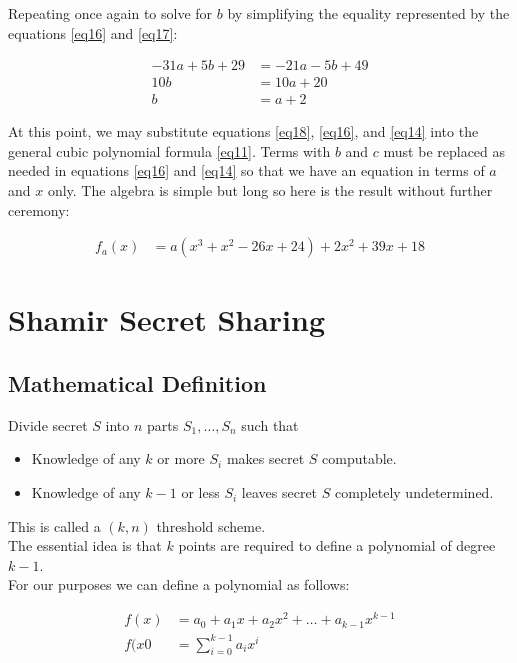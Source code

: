 \documentclass[preview,border=3mm]{article}
\begin{document}
\noindent
Repeating once again to solve for $b$ by simplifying the equality represented
by the equations \ref{eq16} and \ref{eq17}:

\begin{align}
    -31a + 5b + 29 &= -21a - 5b + 49 \nonumber \\
    10b &= 10a + 20 \nonumber \\
    b &= a + 2 \label{eq18}
\end{align}

\noindent
At this point, we may substitute equations \ref{eq18}, \ref{eq16}, and \ref{eq14}
into the general cubic polynomial formula \ref{eq11}. Terms with $b$ and $c$
must be replaced as needed in equations \ref{eq16} and \ref{eq14} so that we
have an equation in terms of $a$ and $x$ only. The algebra is simple but long
so here is the result without further ceremony:

\begin{align}
    f_a(x) &= a(x^3 + x^2 - 26x + 24) + 2x^2 + 39x + 18 \label{eq19}
\end{align}


\section{Shamir Secret Sharing}

\subsection{Mathematical Definition}

Divide secret $S$ into $n$ parts $S_1,\ldots,S_n$ such that

\begin{itemize}
    \item Knowledge of any $k$ or more $S_i$ makes secret $S$ computable.
    \item Knowledge of any $k-1$ or less $S_i$ leaves secret $S$ completely undetermined.
\end{itemize}

\noindent
This is called a $(k,n)$ threshold scheme.\\

\noindent
The essential idea is that $k$ points are required to define a polynomial of
degree $k-1$.\\

\noindent
For our purposes we can define a polynomial as follows:

\begin{align}
    f(x) &= a_0 + a_1x + a_2x^2 + \ldots + a_{k-1}x^{k-1} \\
    f(x0 &= \sum_{i=0}^{k-1} a_ix^i
\end{align}
\end{document}
